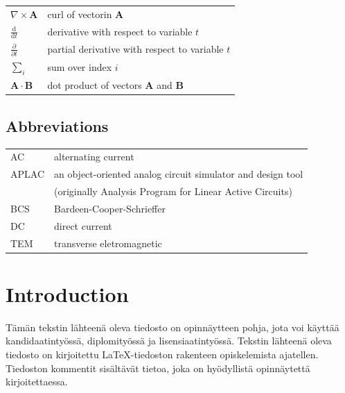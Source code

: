\documentclass[english, 12pt, a4paper, elec, utf8, a-1b, online]{aaltothesis}
\begin{document}
\begin{tabular}{ll}
$\nabla \times \mathbf{A}$              & curl of vectorin $\mathbf{A}$\\
$\displaystyle\frac{\mbox{d}}{\mbox{d} t}$ & derivative with respect to 
variable $t$\\[3mm]
$\displaystyle\frac{\partial}{\partial t}$  & partial derivative with respect 
to variable $t$ \\[3mm]
$\sum_i $                       & sum over index $i$\\
$\mathbf{A} \cdot \mathbf{B}$    & dot product of vectors $\mathbf{A}$ and 
$\mathbf{B}$
\end{tabular}

\subsection*{Abbreviations}

\begin{tabular}{ll}
AC         & alternating current \\
APLAC      & an object-oriented analog circuit simulator and design tool \\
           & (originally Analysis Program for Linear Active Circuits) \\
BCS        & Bardeen-Cooper-Schrieffer \\ %
DC         & direct current \\
TEM        & transverse eletromagnetic
\end{tabular}


\cleardoublepage

\section{Introduction}

\thispagestyle{empty}

T\"am\"an tekstin l\"ahteen\"a oleva tiedosto on opinn\"aytteen
pohja, jota voi k\"aytt\"a\"a kandidaatinty\"oss\"a, diplomity\"oss\"a ja
lisensiaatinty\"oss\"a. Tekstin 
l\"ahteen\"a oleva tiedosto on kirjoitettu  \LaTeX-tiedoston rakenteen
opiskelemista ajatellen. Tiedoston kommentit sis\"alt\"av\"at
tietoa, joka on hy\"odyllist\"a opinn\"aytett\"a kirjoitettaessa. 
\end{document}

